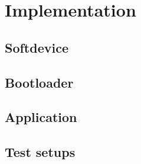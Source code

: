 \section{Implementation}

\subsection{Softdevice}

\subsection{Bootloader}

\subsection{Application}

\subsection{Test setups}